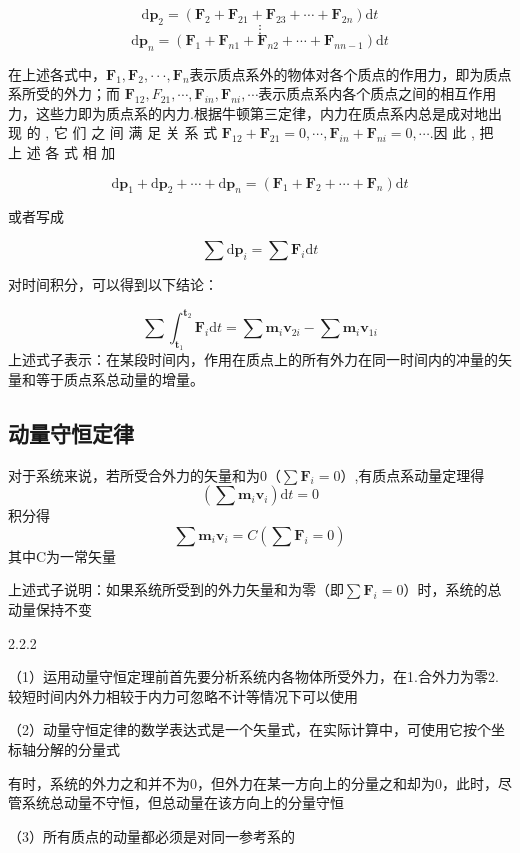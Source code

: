 $$\mathrm{d}\boldsymbol{p}_{2}=(\boldsymbol{F}_{2}+\boldsymbol{F}_{21}+\boldsymbol{F}_{23}+\cdots+\boldsymbol{F}_{2n})\mathrm{d}t$$
$$\vdots$$
$$\mathrm{d}\boldsymbol{p}_{n}=(\boldsymbol{F}_{1}+\boldsymbol{F}_{n1}+\boldsymbol{F}_{n2}+\cdots+\boldsymbol{F}_{n n-1})\mathrm{d}t$$


在上述各式中，$\boldsymbol{F}_1,\boldsymbol{F}_2,\cdotp\cdotp\cdotp,\boldsymbol{F}_n$表示质点系外的物体对各个质点的作用力，即为质点系所受的外力；而 $\boldsymbol{F}_{12},F_{21},\cdots,\boldsymbol{F}_{in},\boldsymbol{F}_{ni},\cdots$表示质点系内各个质点之间的相互作用力，这些力即为质点系的内力.根据牛顿第三定律，内力在质点系内总是成对地出 现 的 , 它 们 之 间 满 足 关 系 式 $\boldsymbol{F}_{12}+ \boldsymbol{F}_{21}= 0, \cdots , \boldsymbol{F}_{in}+ \boldsymbol{F}_{ni}= 0, \cdots .$因 此 , 把 上 述 各 式 相 加

$$\mathrm{d}\boldsymbol{p}_{1}+\mathrm{d}\boldsymbol{p}_{2}+\cdots+\mathrm{d}\boldsymbol{p}_{n}=(\boldsymbol{F}_{1}+\boldsymbol{F}_{2}+\cdots+\boldsymbol{F}_{n})\mathrm{d}t$$

或者写成

$$\sum \mathrm{d}\boldsymbol{p}_i=\sum\boldsymbol{F}_i\mathrm{d}t$$

对时间积分，可以得到以下结论：
\begin{theorem}[质点系动量定理]
    \[
    \sum \int_{\boldsymbol{t}_1}^{\boldsymbol{t}_2}\boldsymbol{F}_i\mathrm{d}t=\sum \boldsymbol{m}_i\boldsymbol{v}_{2i} - \sum \boldsymbol{m}_i\boldsymbol{v}_{1i}
    \]
    上述式子表示：在某段时间内，作用在质点上的所有外力在同一时间内的冲量的矢量和等于质点系总动量的增量。
\end{theorem}


\subsection{动量守恒定律}

    对于系统来说，若所受合外力的矢量和为0（$\sum\boldsymbol{F}_i=0$）,有质点系动量定理得
$$
(\sum \boldsymbol{m}_i\boldsymbol{v}_{i})\mathrm{d}t=0
$$
积分得
$$
\sum \boldsymbol{m}_i\boldsymbol{v}_{i}=C(\sum\boldsymbol{F}_i=0)
$$
其中C为一常矢量

上述式子说明：如果系统所受到的外力矢量和为零（即$\sum\boldsymbol{F}_i=0$）时，系统的总动量保持不变

\begin{knowledge}{ }{2.2.2}

    （1）运用动量守恒定理前首先要分析系统内各物体所受外力，在1.合外力为零2.较短时间内外力相较于内力可忽略不计等情况下可以使用

    （2）动量守恒定律的数学表达式是一个矢量式，在实际计算中，可使用它按个坐标轴分解的分量式

    有时，系统的外力之和并不为0，但外力在某一方向上的分量之和却为0，此时，尽管系统总动量不守恒，但总动量在该方向上的分量守恒

    （3）所有质点的动量都必须是对同一参考系的

\end{knowledge}

